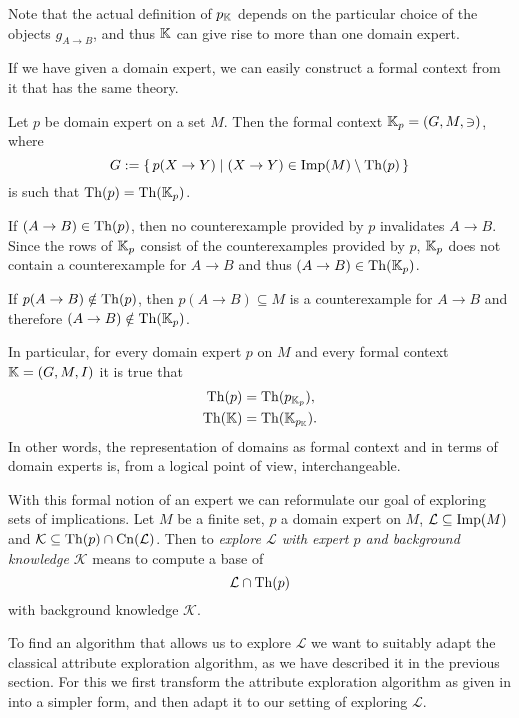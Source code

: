 Note that the actual definition of $p_{{\mathbb{K}}}$ depends on the particular choice of the
objects $g_{A \to B}$, and thus ${\mathbb{K}}$ can give rise to more than one domain expert.

If we have given a domain expert, we can easily construct a formal context from it that
has the same theory.

\begin{Proposition}
  \label{prop:domain-from-domain-expert}
  Let $p$ be domain expert on a set $M$.  Then the formal context ${\mathbb{K}}_p = (G, M, \ni)$,
  where
  \begin{equation*}
    G := {\{\, p(X \to Y) \mid (X \to Y) \in \operatorname{Imp}(M) \setminus \operatorname{Th}(p) \,\}}
  \end{equation*}
  is such that $\operatorname{Th}(p) = \operatorname{Th}({\mathbb{K}}_p)$.
\end{Proposition}
\begin{Proof}
  If $(A \to B) \in \operatorname{Th}(p)$, then no counterexample provided by $p$ invalidates $A \to
  B$.  Since the rows of ${\mathbb{K}}_p$ consist of the counterexamples provided by $p$, ${\mathbb{K}}_p$ does not contain a counterexample for $A \to B$ and thus $(A \to B) \in \operatorname{Th}({\mathbb{K}}_p)$.

  If $p(A \to B) \notin \operatorname{Th}(p)$, then $p(A \to B) \subseteq M$ is a counterexample for $A
  \to B$ and therefore $(A \to B) \notin \operatorname{Th}({\mathbb{K}}_p)$.
\end{Proof}

In particular, for every domain expert $p$ on $M$ and every formal context ${\mathbb{K}} = (G,
M, I)$ it is true that
\begin{align*}
  \operatorname{Th}(p) &= \operatorname{Th}(p_{{\mathbb{K}}_p}), \\
  \operatorname{Th}({\mathbb{K}}) &= \operatorname{Th}({\mathbb{K}}_{p_{{\mathbb{K}}}}).
\end{align*}
In other words, the representation of domains as formal context and in terms of domain
experts is, from a logical point of view, interchangeable.

With this formal notion of an expert we can reformulate our goal of exploring sets of
implications.  Let $M$ be a finite set, $p$ a domain expert on $M$, $\mathcal{L} \subseteq
\operatorname{Imp}(M)$ and $\mathcal{K} \subseteq \operatorname{Th}(p) \cap \operatorname{Cn}(\mathcal{L})$.  Then to \emph{explore
  $\mathcal{L}$ with expert $p$ and background knowledge $\mathcal{K}$} means to compute a
base of
\begin{equation*}
  \mathcal{L} \cap \operatorname{Th}(p)
\end{equation*}
with background knowledge $\mathcal{K}$.

To find an algorithm that allows us to explore $\mathcal{L}$ we want to suitably adapt the
classical attribute exploration algorithm, as we have described it in the previous
section.  For this we first transform the attribute exploration algorithm as given in
 into a simpler form, and then adapt it to our setting of
exploring $\mathcal{L}$.

